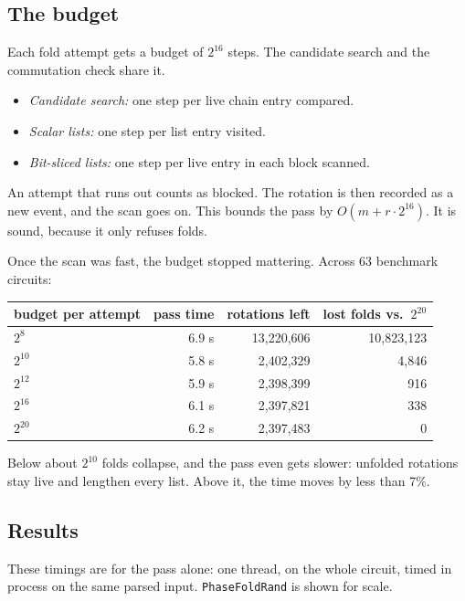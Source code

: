 \documentclass[11pt]{article}
\theoremstyle{definition}
\theoremstyle{remark}
\begin{document}
\subsection{The budget}

Each fold attempt gets a budget of $2^{16}$ steps. The candidate search and the
commutation check share it.
\begin{itemize}[nosep]
  \item \emph{Candidate search:} one step per live chain entry compared.
  \item \emph{Scalar lists:} one step per list entry visited.
  \item \emph{Bit-sliced lists:} one step per live entry in each block scanned.
\end{itemize}
An attempt that runs out counts as blocked. The rotation is then recorded as a new event,
and the scan goes on. This bounds the pass by $O(m + r \cdot 2^{16})$. It is sound, because
it only refuses folds.

Once the scan was fast, the budget stopped mattering. Across 63 benchmark circuits:

\begin{center}
\small
\begin{tabular}{@{}lrrr@{}}
\toprule
budget per attempt & pass time & rotations left & lost folds vs.\ $2^{20}$ \\
\midrule
$2^{8}$ & 6.9 s & 13{,}220{,}606 & 10{,}823{,}123 \\
$2^{10}$ & 5.8 s & 2{,}402{,}329 & 4{,}846 \\
$2^{12}$ & 5.9 s & 2{,}398{,}399 & 916 \\
$2^{16}$ & 6.1 s & 2{,}397{,}821 & 338 \\
$2^{20}$ & 6.2 s & 2{,}397{,}483 & 0 \\
\bottomrule
\end{tabular}
\end{center}

Below about $2^{10}$ folds collapse, and the pass even gets slower: unfolded rotations stay
live and lengthen every list. Above it, the time moves by less than 7\%.

\subsection{Results}

These timings are for the pass alone: one thread, on the whole circuit, timed in process
on the same parsed input. \texttt{PhaseFoldRand} is shown for scale.
\end{document}
